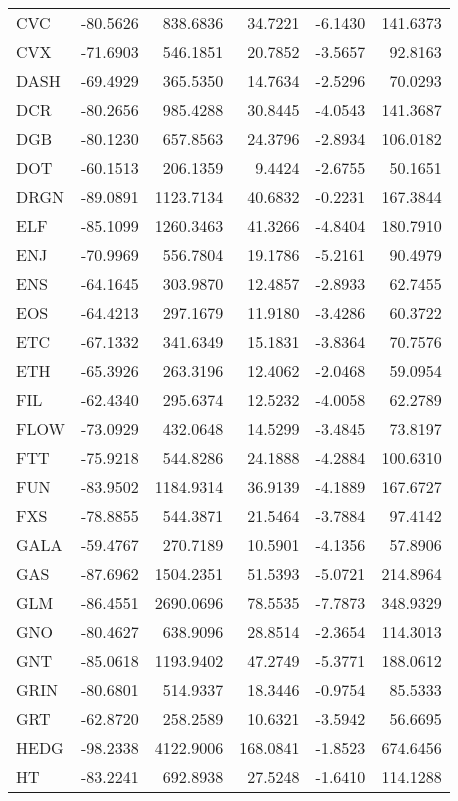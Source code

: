 \begin{table}[ht]
\begin{tabular}{lrrrrr}
CVC & -80.5626 & 838.6836 & 34.7221 & -6.1430 & 141.6373 \\
CVX & -71.6903 & 546.1851 & 20.7852 & -3.5657 & 92.8163 \\
DASH & -69.4929 & 365.5350 & 14.7634 & -2.5296 & 70.0293 \\
DCR & -80.2656 & 985.4288 & 30.8445 & -4.0543 & 141.3687 \\
DGB & -80.1230 & 657.8563 & 24.3796 & -2.8934 & 106.0182 \\
DOT & -60.1513 & 206.1359 & 9.4424 & -2.6755 & 50.1651 \\
DRGN & -89.0891 & 1123.7134 & 40.6832 & -0.2231 & 167.3844 \\
ELF & -85.1099 & 1260.3463 & 41.3266 & -4.8404 & 180.7910 \\
ENJ & -70.9969 & 556.7804 & 19.1786 & -5.2161 & 90.4979 \\
ENS & -64.1645 & 303.9870 & 12.4857 & -2.8933 & 62.7455 \\
EOS & -64.4213 & 297.1679 & 11.9180 & -3.4286 & 60.3722 \\
ETC & -67.1332 & 341.6349 & 15.1831 & -3.8364 & 70.7576 \\
ETH & -65.3926 & 263.3196 & 12.4062 & -2.0468 & 59.0954 \\
FIL & -62.4340 & 295.6374 & 12.5232 & -4.0058 & 62.2789 \\
FLOW & -73.0929 & 432.0648 & 14.5299 & -3.4845 & 73.8197 \\
FTT & -75.9218 & 544.8286 & 24.1888 & -4.2884 & 100.6310 \\
FUN & -83.9502 & 1184.9314 & 36.9139 & -4.1889 & 167.6727 \\
FXS & -78.8855 & 544.3871 & 21.5464 & -3.7884 & 97.4142 \\
GALA & -59.4767 & 270.7189 & 10.5901 & -4.1356 & 57.8906 \\
GAS & -87.6962 & 1504.2351 & 51.5393 & -5.0721 & 214.8964 \\
GLM & -86.4551 & 2690.0696 & 78.5535 & -7.7873 & 348.9329 \\
GNO & -80.4627 & 638.9096 & 28.8514 & -2.3654 & 114.3013 \\
GNT & -85.0618 & 1193.9402 & 47.2749 & -5.3771 & 188.0612 \\
GRIN & -80.6801 & 514.9337 & 18.3446 & -0.9754 & 85.5333 \\
GRT & -62.8720 & 258.2589 & 10.6321 & -3.5942 & 56.6695 \\
HEDG & -98.2338 & 4122.9006 & 168.0841 & -1.8523 & 674.6456 \\
HT & -83.2241 & 692.8938 & 27.5248 & -1.6410 & 114.1288 \\

\end{tabular}
\end{table}
